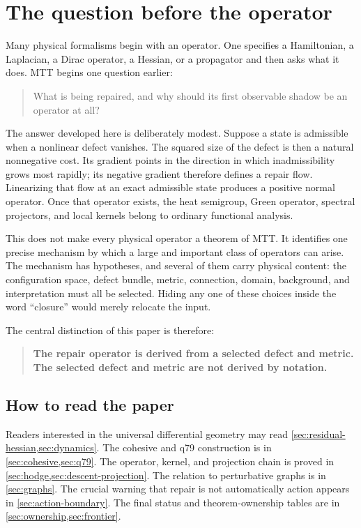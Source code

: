 \documentclass[11pt,a4paper]{article}
\begin{document}
\clearpage
\begingroup
\fontsize{9}{10.5}\selectfont
\tableofcontents
\endgroup
\clearpage

\section{The question before the operator}

Many physical formalisms begin with an operator.  One specifies a
Hamiltonian, a Laplacian, a Dirac operator, a Hessian, or a propagator and
then asks what it does.  MTT begins one question earlier:
\begin{quote}
What is being repaired, and why should its first observable shadow be an
operator at all?
\end{quote}

The answer developed here is deliberately modest.  Suppose a state is
admissible when a nonlinear defect vanishes.  The squared size of the defect
is then a natural nonnegative cost.  Its gradient points in the direction in
which inadmissibility grows most rapidly; its negative gradient therefore
defines a repair flow.  Linearizing that flow at an exact admissible state
produces a positive normal operator.  Once that operator exists, the heat
semigroup, Green operator, spectral projectors, and local kernels belong to
ordinary functional analysis.

This does not make every physical operator a theorem of MTT.  It identifies
one precise mechanism by which a large and important class of operators can
arise.  The mechanism has hypotheses, and several of them carry physical
content: the configuration space, defect bundle, metric, connection, domain,
background, and interpretation must all be selected.  Hiding any one of
these choices inside the word ``closure'' would merely relocate the input.

The central distinction of this paper is therefore:
\begin{quote}
\textbf{The repair operator is derived from a selected defect and metric.
The selected defect and metric are not derived by notation.}
\end{quote}

\subsection{How to read the paper}

Readers interested in the universal differential geometry may read
\cref{sec:residual-hessian,sec:dynamics}.  The cohesive and q79 construction
is in \cref{sec:cohesive,sec:q79}.  The operator, kernel, and projection
chain is proved in \cref{sec:hodge,sec:descent-projection}.  The relation to
perturbative graphs is in \cref{sec:graphs}.  The crucial warning that
repair is not automatically action appears in \cref{sec:action-boundary}.
The final status and theorem-ownership tables are in
\cref{sec:ownership,sec:frontier}.
\end{document}
